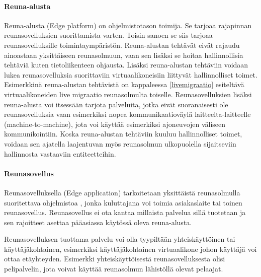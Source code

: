 \paragraph{Reuna-alusta}
Reuna-alusta (Edge platform) on ohjelmistotason toimija. Se tarjoaa rajapinnan reunasovelluksien suorittamista varten\cite{etsirefarch}. Toisin sanoen se siis tarjoaa reunasovelluksille toimintaympäristön.
Reuna-alustan tehtävät eivät rajaudu ainoastaan yksittäiseen reunasolmuun, vaan sen lisäksi se hoitaa hallinnollisia tehtäviä kuten tietoliikenteen ohjausta. Lisäksi reuna-alustan tehtäviin voidaan lukea reunasovelluksia suorittaviin virtuaalikoneisiin liittyvät hallinnolliset toimet. Esimerkkinä reuna-alustan tehtävistä on kappaleessa \ref{livemigraatio} esiteltävä virtuaalikoneiden live migraatio reunasolmulta toiselle.
Reunasovelluksien lisäksi reuna-alusta voi itsessään tarjota palveluita, jotka eivät suoranaisesti ole reunasovelluksia vaan esimerkiksi nopea kommunikaatioväylä laitteelta-laitteelle (machine-to-machine), jota voi käyttää esimerkiksi ajoneuvojen väliseen kommunikointiin.
Koska reuna-alustan tehtäviin kuuluu hallinnolliset toimet, voidaan sen ajatella laajentuvan myös reunasolmun ulkopuolella sijaitseviin hallinnosta vastaaviin entiteetteihin.

\paragraph{Reunasovellus}
Reunasovelluksella (Edge application) tarkoitetaan yksittäistä reunasolmulla suoritettava ohjelmistoa \cite{etsirefarch}, jonka kuluttajana voi toimia asiakaslaite tai toinen reunasovellus. Reunasovellus ei ota kantaa millaista palvelua sillä tuotetaan ja sen rajoitteet asettaa pääasiassa käytössä oleva reuna-alusta. 

Reunasovelluksen tuottama palvelu voi olla tyypiltään yhteiskäyttöinen tai käyttäjäkohtainen, esimerkiksi käyttäjäkohtainen virtuaalikone johon käyttäjä voi ottaa etäyhteyden. Esimerkki yhteiskäyttöisestä reunasovelluksesta olisi pelipalvelin, jota voivat käyttää reunasolmun lähistöllä olevat pelaajat.

